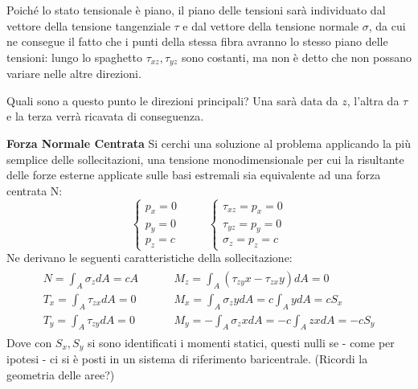 \documentclass{article}
\begin{document}
\begin{adjustwidth}{2in}{}
	Poiché lo stato tensionale è piano, il piano delle tensioni sarà individuato dal vettore della tensione tangenziale $\tau$ e dal vettore della tensione normale $\sigma$, da cui ne consegue il fatto che i punti della stessa fibra avranno lo stesso piano delle tensioni: lungo lo spaghetto $\tau_{xz}, \tau_{yz}$ sono costanti, ma non è detto che non possano variare nelle altre direzioni. \newline
	
	Quali sono a questo punto le direzioni principali? Una sarà data da $z$, l'altra da $\tau$ e la terza verrà ricavata di conseguenza. 
	
\newpage	
	\textbf{\Large Forza Normale Centrata}\newline
	Si cerchi una soluzione al problema applicando la più semplice delle sollecitazioni, una tensione monodimensionale per cui la risultante delle forze esterne applicate sulle basi estremali sia equivalente ad una forza centrata N:
	\[ \begin{cases}
		p_x =0 \\
		p_y = 0 \\
		p_z = c
	\end{cases} \hspace{1cm} \begin{cases}
	\tau_{xz} = p_x = 0 \\
	\tau_{yz} = p_y = 0 \\
	\sigma_z = p_z = c
\end{cases}\]
	Ne derivano le seguenti caratteristiche della sollecitazione:
	\[\begin{matrix}
		\begin{aligned}
			N = \int_A \sigma_zdA = cA \hspace{1cm} & M_z = \int_A (\tau_{zy}x -\tau_{zx}y)dA = 0 \\
			T_x = \int_A \tau_{zx}dA = 0 \hspace{1cm} & M_x = \int_A \sigma_zydA = c\int_A ydA = cS_x  \\
			T_y = \int_A \tau_{zy}dA = 0 \hspace{1cm} & M_y = -\int_A \sigma_zxdA = -c\int_A zxdA = -cS_y
		\end{aligned}	
	\end{matrix}\]
 	Dove con $S_x, S_y$ si sono identificati i momenti statici, questi nulli se - come per ipotesi - ci si è posti in un sistema di riferimento baricentrale.  (Ricordi la geometria delle aree?) \newline
 	

\end{adjustwidth}
\end{document}

